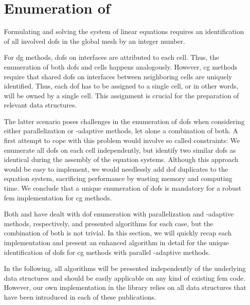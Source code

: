 \section{Enumeration of }
\label{sec:enumeration}

Formulating and solving the system of linear equations requires an identification of all involved \glspl{dof} in the global mesh by an integer number.

For \gls{dg} methods, \glspl{dof} on interfaces are attributed to each cell. Thus, the enumeration of both \glspl{dof} and cells happens analogously. However, \gls{cg} methods require that shared \glspl{dof} on interfaces between neighboring cells are uniquely identified. Thus, each \gls{dof} has to be assigned to a single cell, or in other words, will be owned by a single cell. This assignment is crucial for the preparation of relevant data structures.


The latter scenario poses challenges in the enumeration of \glspl{dof} when considering either parallelization or \hp-adaptive methods, let alone a combination of both. A first attempt to cope with this problem would involve so called constraints: We enumerate all \glspl{dof} on each cell independently, but identify two similar \glspl{dof} as identical during the assembly of the equation systems. Although this approach would be easy to implement, we would needlessly add \gls{dof} duplicates to the equation system, sacrificing performance by wasting memory and computing time. We conclude that a unique enumeration of \glspl{dof} is mandatory for a robust \gls{fem} implementation for \gls{cg} methods.

Both \textcite{bangerth2012} and \textcite{bangerth2009} have dealt with \gls{dof} enumeration with parallelization and \hp-adaptive methods, respectively, and presented algorithms for each case, but the combination of both is not trivial. In this section, we will quickly recap each implementation and present an enhanced algorithm in detail for the unique identification of \glspl{dof} for \gls{cg} methods with parallel \hp-adaptive methods.

In the following, all algorithms will be presented independently of the underlying data structures and should be easily applicable on any kind of existing \gls{fem} code. However, our own implementation in the \dealii{} library relies on all data structures that have been introduced in each of these publications.

